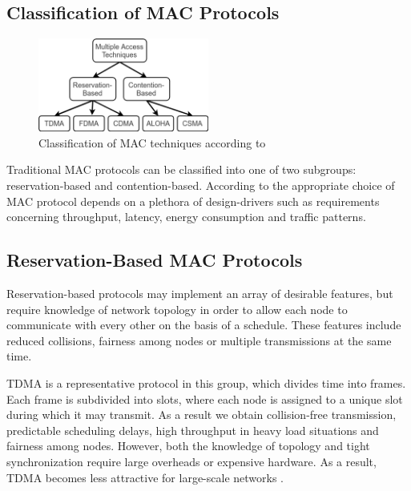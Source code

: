 \subsection{Classification of MAC Protocols}

\begin{figure}[tb] \label{fig:mac-classification}
	\begin{center}
		\includegraphics[width=0.5\textwidth]{pictures/mac_classification}
	\end{center}
	\caption{Classification of MAC techniques according to \cite{Garg07}}
\end{figure}

Traditional MAC protocols can be classified into one of two subgroups: reservation-based and contention-based. According to \cite{Bachir10} the appropriate choice of MAC protocol depends on a plethora of design-drivers such as requirements concerning throughput, latency, energy consumption and traffic patterns.

\subsection{Reservation-Based MAC Protocols}

Reservation-based protocols may implement an array of desirable features, but require knowledge of network topology in order to allow each node to communicate with every other on the basis of a schedule. These features include reduced collisions, fairness among nodes or multiple transmissions at the same time.

TDMA is a representative protocol in this group, which divides time into frames. Each frame is subdivided into slots, where each node is assigned to a unique slot during which it may transmit. As a result we obtain collision-free transmission, predictable scheduling delays, high throughput in heavy load situations and fairness among nodes. However, both the knowledge of topology and tight synchronization require large overheads or expensive hardware. As a result, TDMA becomes less attractive for large-scale networks \cite{Bachir10}.  


